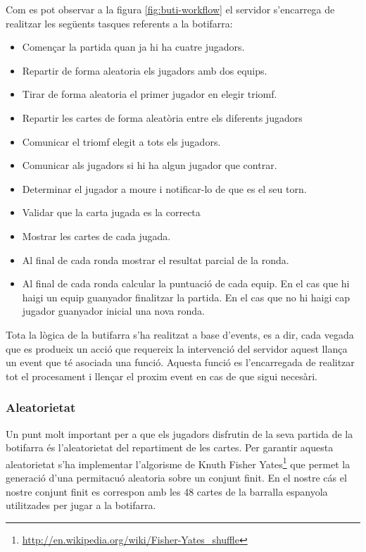 \newpage

Com es pot observar a la figura \ref{fig:buti-workflow} el servidor s'encarrega de realitzar les següents tasques referents a la botifarra: 

\begin{itemize}
\item{Començar la partida quan ja hi ha cuatre jugadors. }
\item{Repartir de forma aleatoria els jugadors amb dos equips. }
\item{Tirar de forma aleatoria el primer jugador en elegir triomf.}
\item{Repartir les cartes de forma aleatòria entre els diferents jugadors}
\item{Comunicar el triomf elegit a tots els jugadors.}
\item{Comunicar als jugadors si hi ha algun jugador que contrar.}
\item{Determinar el jugador a moure i notificar-lo de que es el seu torn.}
\item{Validar que la carta jugada es la correcta}
\item{Mostrar les cartes de cada jugada.}
\item{Al final de cada ronda mostrar el resultat parcial de la ronda. }
\item{Al final de cada ronda calcular la puntuació de cada equip. En el cas que hi haigi un equip guanyador finalitzar la partida. En el cas que no hi haigi cap jugador guanyador inicial una nova ronda.}
\end{itemize}

Tota la lògica de la butifarra s'ha realitzat a base d'events, es a dir, cada vegada que es produeix un acció que requereix la intervenció del servidor aquest llança un event que té asociada una funció. Aquesta funció es l'encarregada de realitzar tot el procesament i llençar el proxim event en cas de que sigui necesàri.  


\subsubsection{Aleatorietat}

Un punt molt important per a que els jugadors disfrutin de la seva partida de la botifarra és l'aleatorietat del repartiment de les cartes. Per garantir aquesta aleatorietat s'ha implementar l'algorisme de Knuth Fisher Yates\footnote{\url{http://en.wikipedia.org/wiki/Fisher-Yates_shuffle}} que permet la generació d'una permitacuó aleatoria sobre un conjunt finit. En el nostre cás el nostre conjunt finit es correspon amb les 48 cartes de la barralla espanyola utilitzades per jugar a la botifarra. 


